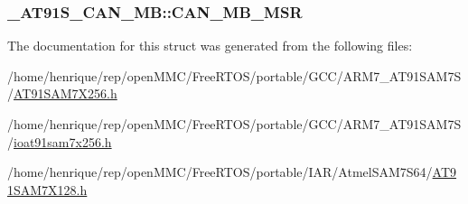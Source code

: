 \hypertarget{struct__AT91S__CAN__MB_ac0b6e12f73a44773934bb212117ca2b7}{
\subsubsection[{C\-A\-N\-\_\-\-M\-B\-\_\-\-M\-S\-R}]{ \-\_\-\-A\-T91\-S\-\_\-\-C\-A\-N\-\_\-\-M\-B\-::\-C\-A\-N\-\_\-\-M\-B\-\_\-\-M\-S\-R}}\label{struct__AT91S__CAN__MB_ac0b6e12f73a44773934bb212117ca2b7}


The documentation for this struct was generated from the following files\-:\begin{DoxyCompactItemize}
\item 
/home/henrique/rep/open\-M\-M\-C/\-Free\-R\-T\-O\-S/portable/\-G\-C\-C/\-A\-R\-M7\-\_\-\-A\-T91\-S\-A\-M7\-S/\hyperlink{GCC_2ARM7__AT91SAM7S_2AT91SAM7X256_8h}{A\-T91\-S\-A\-M7\-X256.\-h}\item 
/home/henrique/rep/open\-M\-M\-C/\-Free\-R\-T\-O\-S/portable/\-G\-C\-C/\-A\-R\-M7\-\_\-\-A\-T91\-S\-A\-M7\-S/\hyperlink{ioat91sam7x256_8h}{ioat91sam7x256.\-h}\item 
/home/henrique/rep/open\-M\-M\-C/\-Free\-R\-T\-O\-S/portable/\-I\-A\-R/\-Atmel\-S\-A\-M7\-S64/\hyperlink{AT91SAM7X128_8h}{A\-T91\-S\-A\-M7\-X128.\-h}\end{DoxyCompactItemize}
